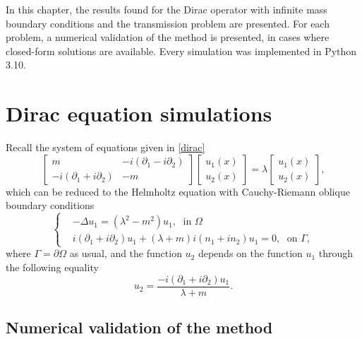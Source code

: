 \label{chap:implement}

In this chapter, the results found for the Dirac operator with infinite mass boundary conditions and the transmission problem are presented. For each problem, a numerical validation of the method is presented, in cases where closed-form solutions are available. Every simulation was implemented in Python 3.10.

\section{Dirac equation simulations}\label{dirac_equation_simulations}

Recall the system of equations given in \eqref{dirac}
\begin{equation}\label{chapt_num_dirac_eq}
    \begin{bmatrix}
        m & -i(\partial_1 - i \partial_2)\\
        -i(\partial_1 + i \partial_2) & -m
    \end{bmatrix}
    \begin{bmatrix}
        u_1(x)\\
        u_2(x)
    \end{bmatrix}
    =\lambda
    \begin{bmatrix}
    u_1(x)\\
    u_2(x)
    \end{bmatrix},
\end{equation}
which can be reduced to the Helmholtz equation with Cauchy-Riemann oblique boundary conditions
\begin{equation*}
    \begin{cases}
        &-\Delta u_1 = (\lambda^2 - m^2)u_1, \; \text{ in } \Omega\\
        & i (\partial_1 + i\partial_2)u_1 + (\lambda + m)i(n_1 + i n_2)u_1 = 0, \; \text{ on } \Gamma,
    \end{cases}
\end{equation*}
where \(\Gamma = \partial\Omega\) as usual, and the function \(u_2\) depends on the function \(u_1\) through the following equality
\[
    u_2 = \frac{-i (\partial_1 + i\partial_2)u_1}{\lambda + m}.
\]
\subsection{Numerical validation of the method}

